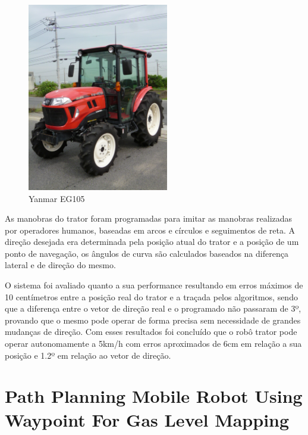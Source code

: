 \begin{figure}[H]
    \centering
    \includegraphics[width=0.55\textwidth]{figuras/EG105 yanmar.JPG}
    \caption{Yanmar EG105}
    \label{fig:yanmar:eg105}
\end{figure}

As manobras do trator foram programadas para imitar as manobras realizadas por operadores humanos, baseadas em arcos e círculos e seguimentos de reta. A direção desejada era determinada pela posição atual do trator e a posição de um ponto de navegação, os ângulos de curva são calculados baseados na diferença lateral e de direção do mesmo.

O sistema foi avaliado quanto a sua performance resultando em erros máximos de 10 centímetros entre a posição real do trator e a traçada pelos algoritmos, sendo que a diferença entre o vetor de direção real e o programado não passaram de 3º, provando que o mesmo pode operar de forma precisa sem necessidade de grandes mudanças de direção. Com esses resultados foi concluído que o robô trator pode operar autonomamente a 5km/h com erros aproximados de 6cm em relação a sua posição e 1.2º em relação ao vetor de direção.
\section{Path Planning Mobile Robot Using Waypoint
For Gas Level Mapping}


